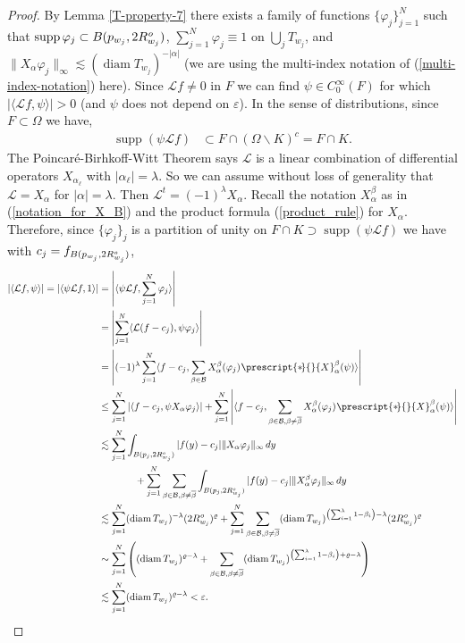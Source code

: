 \documentclass[12pt,a4paper,reqno]{amsart}
\DeclareMathOperator{\supp}{supp}
\renewcommand{\L}{\mathcal{L}}
\newcommand{\out}{{\it o}}
\newcommand{\Rout}{R^{\out}}
\renewcommand{\l}{\lambda}
\renewcommand{\a}{\alpha}
\newcommand{\diam}{\operatorname{diam}}
\numberwithin{equation}{section}
\theoremstyle{definition}
\renewcommand*{\star}[2][-3mu]{\ensuremath{\mskip1mu\prescript{\smash{\mathrm *\mkern#1}}{}{\mathstrut#2}}}
\begin{document}
\begin{proof}
By Lemma \ref{T-property-7} there exists a family of functions $\{ \varphi_j \}_{j=1}^N$ such that $\supp \varphi_j \subset B(p_{w_j}, 2\Rout_{w_j})$, $\sum_{j=1}^N \varphi_{j} \equiv 1$ on $\bigcup_j T_{w_j}$, and $\| X_{\a} \varphi_{j}\|_{\infty} \lesssim (\diam T_{w_j})^{-|\a|}$ (we are using the multi-index notation of (\ref{multi-index-notation}) here). Since $\L f \neq 0$ in $F$ we can find $\psi \in C_0^{\infty}(F)$ for which $| \langle \L f, \psi \rangle | > 0$ (and $\psi$ does not depend on $\varepsilon$). In the sense of distributions, since $F \subset \Omega$ we have, \begin{align}
 \supp (\psi \L f) &\subset F \cap (\Omega \backslash K)^c \nonumber =
 F \cap K. \nonumber
\end{align} The Poincar\'{e}-Birhkoff-Witt Theorem says $\L$ is a linear combination of differential operators $X_{\a_{\ell}}$ with $| \a_{\ell}| = \l$. So we can assume without loss of generality that $\L =X_{\a}$ for $|\a| = \l$. Then $\L^t  = (-1)^{\l}X_{\a}$. Recall the notation $X_{\a}^{\beta}$ as in (\ref{notation_for_X_B}) and the product formula (\ref{product_rule}) for $X_{\a}$. Therefore, since $\{ \varphi_j\}_j$ is a partition of unity on $ F \cap K \supset \supp (\psi \L f)$ we have with $c_j = f_{B(p_{w_j},2\Rout_{w_j})}$, \begin{align*}
|\langle \L f, \psi \rangle| = |\langle \psi \L f , 1 \rangle| &= \left| \langle \psi \L f , \sum_{j=1}^N \varphi_j \rangle \right| \\ &= \left| \sum_{j=1}^N \langle \L (f-c_j) , \psi \varphi_j \rangle \right| \\ &= \left| (-1)^{\l} \sum_{j=1}^N \langle f - c_j , \sum_{\beta \in \mathcal{B}} X_{\a}^{\beta}(\varphi_j) \star{X}_{\a}^{\beta}(\psi) \rangle \right|  \\ &\leq \sum_{j=1}^N |\langle f -c_j ,\psi X_{\a} \varphi_j \rangle| + \sum_{j=1}^N \left| \langle f -c_j , \sum_{\beta \in \mathcal{B}, \beta \neq \overline{\beta}} X_{\a}^{\beta}(\varphi_j)\star{X}_{\a}^{\beta}(\psi) \rangle \right| \\ &\lesssim \sum_{j=1}^N \int_{B(p_j , 2\Rout_{w_j})} |f(y) - c_j| \| X_{\a} \varphi_j\|_{\infty}\,dy \\ &\,\,\,\,\,\,\,\,\,\,\,\,\,\,\,\,\,\,\,\,\,\, + \sum_{j=1}^N \sum_{\beta \in \mathcal{B}, \beta\neq \overline{\beta}} \int_{B(p_j , 2\Rout_{w_j})} |f(y) - c_j| \| X_{\a}^{\beta} \varphi_j\|_{\infty}\,dy  \\ &\lesssim \sum_{j=1}^N (\diam T_{w_j})^{-\l} (2\Rout_{w_j})^{\varrho} + \sum_{j=1}^N \sum_{\beta \in \mathcal{B} , \beta \neq \overline{\beta}} (\diam T_{w_j})^{\left(\sum_{i=1}^{\l} 1-\beta_i \right)-\l}(2\Rout_{w_j})^{\varrho} \\ &\sim \sum_{j=1}^N\left( (\diam T_{w_j})^{\varrho - \l} + \sum_{\beta \in \mathcal{B}, \beta \neq \overline{\beta}} (\diam T_{w_j})^{\left(\sum_{i=1}^{\l} 1-\beta_i \right) + \varrho -\l}\right) \\ &\lesssim \sum_{j=1}^N (\diam T_{w_j})^{\varrho -\l} < \varepsilon.

\end{align*}
\end{proof}
\end{document}
